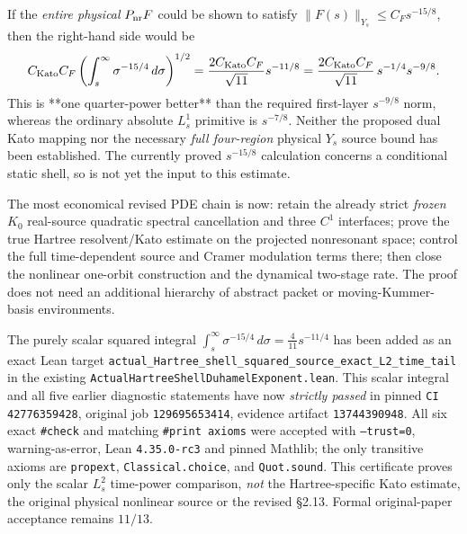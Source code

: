 \documentclass[11pt]{amsart}
\begin{document}
If the \emph{entire physical} \(P_{\rm nr}F\)
could be shown to satisfy
\(\|F(s)\|_{Y_s}\le C_Fs^{-15/8}\), then the
right-hand side would be
\[
 C_{\rm Kato}C_F
 \left(\int_s^\infty\sigma^{-15/4}\,d\sigma\right)^{1/2}
 =\frac{2C_{\rm Kato}C_F}{\sqrt{11}}s^{-11/8}
 =\frac{2C_{\rm Kato}C_F}{\sqrt{11}}\,
   s^{-1/4}s^{-9/8}.
\]
This is **one quarter-power better** than
the required first-layer \(s^{-9/8}\) norm,
whereas the ordinary absolute \(L_s^1\)
primitive is \(s^{-7/8}\).
Neither the proposed dual Kato mapping nor
the necessary \emph{full four-region} physical
\(Y_s\) source bound has been established.
The currently proved \(s^{-15/8}\) calculation
concerns a conditional static shell,
so is not yet the input to this estimate.

The most economical revised PDE chain is now:
retain the already strict \emph{frozen} \(K_0\)
real-source quadratic spectral cancellation
and three \(C^1\) interfaces; prove the true
Hartree resolvent/Kato estimate on the
projected nonresonant space; control the full
time-dependent source and Cramer modulation
terms there; then close the nonlinear
one-orbit construction and the dynamical
two-stage rate. The proof does not need
an additional hierarchy of abstract packet
or moving-Kummer-basis environments.

The purely scalar squared integral
\(\int_s^\infty\sigma^{-15/4}\,d\sigma
 =\frac4{11}s^{-11/4}\)
has been added as an exact Lean target
\texttt{actual\_Hartree\_shell\_squared\_source\_exact\_L2\_time\_tail}
in the existing
\texttt{ActualHartreeShellDuhamelExponent.lean}.
This scalar integral and all five earlier
diagnostic statements have now \emph{strictly
passed} in pinned \texttt{CI 42776359428},
original job \texttt{129695653414},
evidence artifact \texttt{13744390948}.
All six exact \texttt{\#check} and matching
\texttt{\#print axioms} were accepted with
\texttt{--trust=0}, warning-as-error,
Lean \texttt{4.35.0-rc3} and pinned Mathlib;
the only transitive axioms are
\texttt{propext}, \texttt{Classical.choice},
and \texttt{Quot.sound}.
This certificate proves only the scalar
\(L_s^2\) time-power comparison, \emph{not}
the Hartree-specific Kato estimate,
the original physical nonlinear source or
the revised §2.13.
Formal original-paper acceptance remains \(11/13\).
\end{document}
